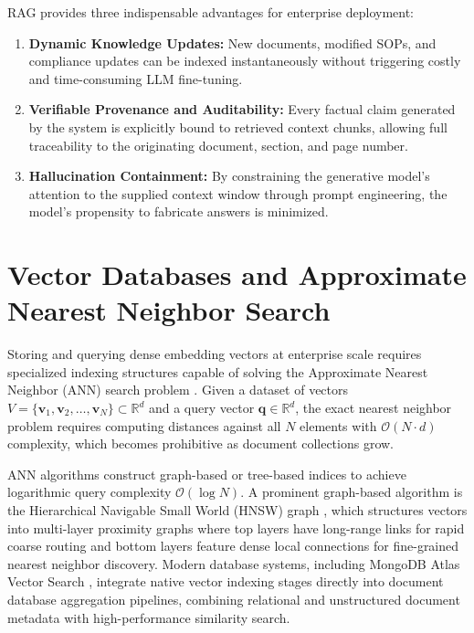 RAG provides three indispensable advantages for enterprise deployment:
\begin{enumerate}
    \item \textbf{Dynamic Knowledge Updates:} New documents, modified SOPs, and compliance updates can be indexed instantaneously without triggering costly and time-consuming LLM fine-tuning.
    \item \textbf{Verifiable Provenance and Auditability:} Every factual claim generated by the system is explicitly bound to retrieved context chunks, allowing full traceability to the originating document, section, and page number.
    \item \textbf{Hallucination Containment:} By constraining the generative model's attention to the supplied context window through prompt engineering, the model's propensity to fabricate answers is minimized.
\end{enumerate}

\section{Vector Databases and Approximate Nearest Neighbor Search}
\label{sec:lit_vector_db}

Storing and querying dense embedding vectors at enterprise scale requires specialized indexing structures capable of solving the Approximate Nearest Neighbor (ANN) search problem \cite{johnson2019billion}. Given a dataset of vectors $V = \{\mathbf{v}_1, \mathbf{v}_2, \dots, \mathbf{v}_N\} \subset \mathbb{R}^d$ and a query vector $\mathbf{q} \in \mathbb{R}^d$, the exact nearest neighbor problem requires computing distances against all $N$ elements with $\mathcal{O}(N \cdot d)$ complexity, which becomes prohibitive as document collections grow.

ANN algorithms construct graph-based or tree-based indices to achieve logarithmic query complexity $\mathcal{O}(\log N)$. A prominent graph-based algorithm is the Hierarchical Navigable Small World (HNSW) graph \cite{malkov2018efficient}, which structures vectors into multi-layer proximity graphs where top layers have long-range links for rapid coarse routing and bottom layers feature dense local connections for fine-grained nearest neighbor discovery. Modern database systems, including MongoDB Atlas Vector Search \cite{mongodb2023vector}, integrate native vector indexing stages directly into document database aggregation pipelines, combining relational and unstructured document metadata with high-performance similarity search.

